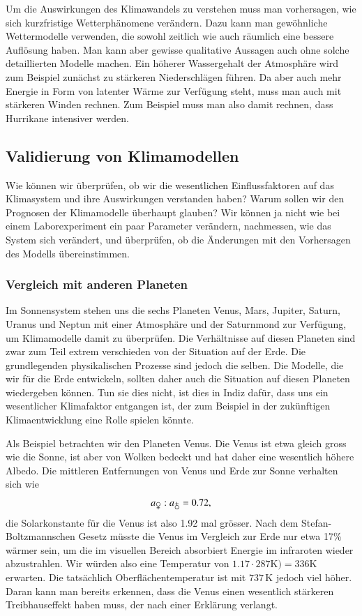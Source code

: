 Um die Auswirkungen des Klimawandels zu verstehen muss man vorhersagen,
wie sich kurzfristige Wetterphänomene verändern.
Dazu kann man gewöhnliche Wettermodelle verwenden, die sowohl zeitlich wie
auch räumlich eine bessere Auflösung haben.
Man kann aber gewisse qualitative Aussagen auch ohne solche detaillierten
Modelle machen.
Ein höherer Wassergehalt der Atmosphäre wird zum Beispiel zunächst
zu stärkeren Niederschlägen führen.
Da aber auch mehr Energie in Form von latenter Wärme zur Verfügung
steht, muss man auch mit stärkeren Winden rechnen.
Zum Beispiel muss man also damit rechnen, dass Hurrikane intensiver
werden.

\subsection{Validierung von Klimamodellen}
Wie können wir überprüfen, ob wir die wesentlichen Einflussfaktoren
auf das Klimasystem und ihre Auswirkungen verstanden haben?
Warum sollen wir den Prognosen der Klimamodelle überhaupt glauben?
Wir können ja nicht wie bei einem Laborexperiment ein paar Parameter
verändern, nachmessen, wie das System sich verändert, und überprüfen,
ob die Änderungen mit den Vorhersagen des Modells übereinstimmen.

\subsubsection{Vergleich mit anderen Planeten}
Im Sonnensystem stehen uns die sechs Planeten Venus,
Mars, Jupiter, Saturn, Uranus und Neptun mit einer Atmosphäre und
der Saturnmond zur Verfügung, um Klimamodelle damit zu überprüfen.
Die Verhältnisse auf diesen Planeten sind zwar zum Teil extrem verschieden
von der Situation auf der Erde.
Die grundlegenden physikalischen Prozesse sind jedoch die selben.
Die Modelle, die wir für die Erde entwickeln, sollten daher auch
die Situation auf diesen Planeten wiedergeben können.
Tun sie dies nicht, ist dies in Indiz dafür, dass uns ein wesentlicher 
Klimafaktor entgangen ist, der zum Beispiel in der zukünftigen Klimaentwicklung
eine Rolle spielen könnte.

Als Beispiel betrachten wir den Planeten Venus.
Die Venus ist etwa gleich gross wie die Sonne, ist aber von Wolken
bedeckt und hat daher eine wesentlich höhere Albedo.
Die mittleren Entfernungen von Venus und Erde zur Sonne verhalten
sich wie
\[
a_{\venus}
:
a_{\earth}
=
0.72,
\]
die Solarkonstante für die Venus ist also 1.92 mal grösser.
Nach dem Stefan-Boltzmannschen Gesetz müsste die Venus im Vergleich
zur Erde nur etwa 17\% wärmer sein, um die im visuellen Bereich
absorbiert Energie im infraroten wieder abzustrahlen.
Wir würden also eine Temperatur von $1.17\cdot 287\text{K})=336\text{K}$
erwarten.
Die tatsächlich Oberflächentemperatur ist mit $737\,\text{K}$ jedoch viel
höher.
Daran kann man bereits erkennen, dass die Venus einen wesentlich
stärkeren Treibhauseffekt haben muss, der nach einer Erklärung
verlangt.

